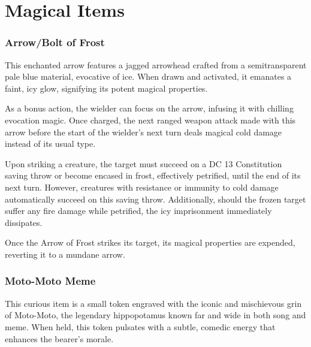 \DungeonSheetGeometry

\chapter{Magical Items}
\subsection*{Arrow/Bolt of Frost}
\label{sec:ArrowBoltOfFrost}
This enchanted arrow features a jagged arrowhead crafted from a semitransparent pale blue material, evocative of ice. When drawn and activated, it emanates a faint, icy glow, signifying its potent magical properties.

As a bonus action, the wielder can focus on the arrow, infusing it with chilling evocation magic. Once charged, the next ranged weapon attack made with this arrow before the start of the wielder's next turn deals magical cold damage instead of its usual type.

Upon striking a creature, the target must succeed on a DC 13 Constitution saving throw or become encased in frost, effectively petrified, until the end of its next turn. However, creatures with resistance or immunity to cold damage automatically succeed on this saving throw. Additionally, should the frozen target suffer any fire damage while petrified, the icy imprisonment immediately dissipates.

Once the Arrow of Frost strikes its target, its magical properties are expended, reverting it to a mundane arrow.

\subsection*{Moto-Moto Meme}
\label{sec:MotoMotoMeme}
This curious item is a small token engraved with the iconic and mischievous grin of Moto-Moto, the legendary hippopotamus known far and wide in both song and meme. When held, this token pulsates with a subtle, comedic energy that enhances the bearer's morale.

